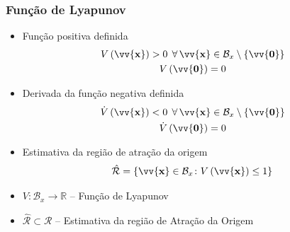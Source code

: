 \documentclass{beamer}
\newcommand*{\Round}[1]{\left(#1\right)}
\newcommand*{\Curly}[1]{\left\{#1\right\}}
\newcommand*{\Set}[1]{\Curly{#1}}
\newcommand*{\Prod}{\,}
\newcommand*{\Bold}[1]{\boldsymbol{\mathbf{#1}}}
\newcommand*{\Vect}[1]{\vv{\Bold{#1}}}
\newcommand*{\Transp}[1]{{#1}^{T}}
\newcommand*{\ForAll}{\:\:\forall\,}
\renewcommand{\Prod}{\,}
\begin{document}
\begin{frame}\frametitle{Função de Lyapunov}
  \begin{itemize}
    \item Função positiva definida
    \begin{gather}
      V\Round{\Vect{x}} > 0 \ForAll \Vect{x} \in \mathcal{B}_x \setminus \Set{\Vect{0}}
      \\
      V\Round{\Vect{0}} = 0
    \end{gather}
    \item Derivada da função negativa definida
    \begin{gather}
      \dot{V}\Round{\Vect{x}} < 0 \ForAll \Vect{x} \in \mathcal{B}_x \setminus \Set{\Vect{0}}
      \\
      \dot{V}\Round{\Vect{0}} = 0
    \end{gather}
    \item Estimativa da região de atração da origem
    \begin{equation}
      \hat{\mathcal{R}} = \left\{\Vect{x} \in \mathcal{B}_x \colon V\Round{\Vect{x}} \leq 1\right\}
    \end{equation}
    \item $V \colon \mathcal{B}_x \to \mathbb{R}$ -- Função de Lyapunov
    \item $\hat{\mathcal{R}} \subset \mathcal{R}$ -- Estimativa da região de Atração da Origem
  \end{itemize}
\end{frame}
\end{document}
